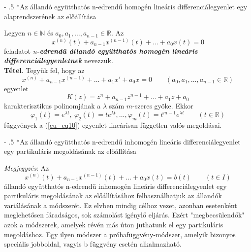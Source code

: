 \documentclass[12pt,margin=0px]{article}
\makeatletter
\renewcommand\paragraph{%
	\@startsection{paragraph}{4}{0mm}%
	{-\baselineskip}%
	{.5\baselineskip}%
	{\normalfont\normalsize\bfseries}}
\makeatother
\begin{document}
    \paragraph*{Az állandó együtthatós n-edrendű homogén lineáris differenciálegyenlet egy alaprendszerének az előállítása}

    \noindent Legyen $n \in \mathbb{N}$ és $a_0, a_1, \ldots, a_{n-1} \in \mathbb{R}$. Az
    \begin{equation}\label{eu_eq9}
        x^{(n)}(t) + a_{n-1}x^{(n-1)}(t) + \ldots + a_{0}x(t) = 0
    \end{equation}
    feladatot \emph{n}\textbf{\emph{-edrendű állandó együtthatós homogén lineáris differenciálegyenletnek}} nevezzük.\\

    \noindent \textbf{Tétel}. Tegyük fel, hogy az
    \begin{equation}\label{eu_eq10}
        x^{(n)} + a_{n-1}x^{(n-1)} + \ldots + a_{1}x' + a_{0}x = 0 \qquad (a_0, a_1, \ldots, a_{n-1} \in \mathbb{R})
    \end{equation}
    egyenlet
    \[
        K(z) = z^{n} + a_{n-1}z^{n-1} + \ldots + a_1z + a_0
    \]
    karakterisztikus polinomjának a $\lambda$ szám $m$-szeres gyöke. Ekkor
    \[
        \varphi_1(t) = e^{\lambda t},\ \varphi_2(t) = te^{\lambda t}, \ldots, \varphi_m(t) = t^{m-1}e^{\lambda t} \qquad (t \in \mathbb{R})
    \]
    függvények a (\ref{eu_eq10}) egyenlet lineárisan független valós megoldásai.

    \paragraph*{Az állandó együtthatós n-edrendű inhomogén lineáris differenciálegyenlet egy partikuláris megoldásának az előállítása}

    \noindent \emph{Megjegyzés}: Az
    \[
        x^{(n)}(t) + a_{n-1}x^{(n-1)}(t) + \ldots + a_{0}x(t) = b(t) \qquad (t \in I)
    \]
    állandó együtthatós n-edrendű inhomogén lineáris differenciálegyenlet egy partikuláris megoldásának az előállításához felhasználhatjuk az állandók variálásának a módszerét. Ez elvben mindig célhoz vezet, azonban esetenként meglehetősen fáradságos, sok számolást igénylő eljárás. Ezért "megbecsülendők" azok a módszerek, amelyek révén más úton juthatunk el egy partikuláris megoldáshoz. Egy ilyen módszer a próbafüggvény-módszer, amelyik bizonyos speciális jobboldal, vagyis b függvény esetén alkalmazható.\\
\end{document}
